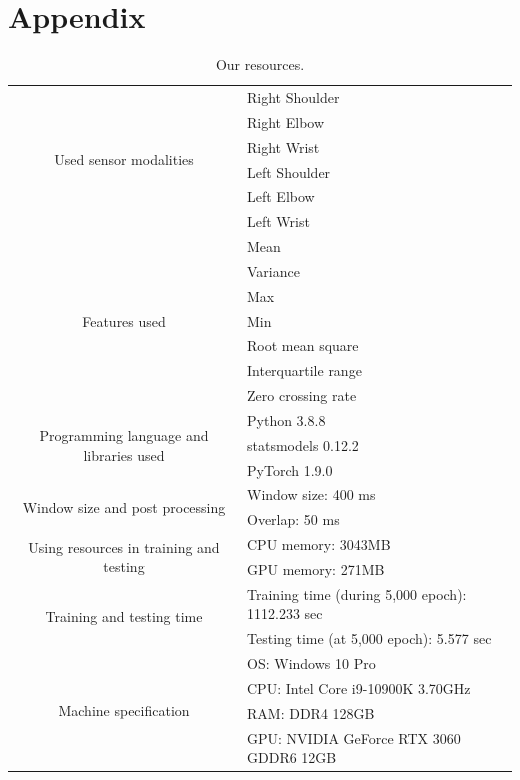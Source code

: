 \documentclass[graybox]{svmult}
\begin{document}





\section*{Appendix}

\begin{table}[ht]
    \centering
    \caption{Our resources.}
    \begin{tabular}{c|l}\hline
    \multirow{6}{*}{Used sensor modalities} & Right Shoulder \\
    & Right Elbow \\
    & Right Wrist \\
    & Left Shoulder \\
    & Left Elbow \\
    & Left Wrist \\ \hline
    \multirow{7}{*}{Features used} & Mean \\
    & Variance \\
    & Max \\
    & Min \\
    & Root mean square \\
    & Interquartile range \\
    & Zero crossing rate \\ \hline
    \multirow{3}{*}{Programming language and libraries used} & Python 3.8.8 \\
    & statsmodels 0.12.2 \\
    & PyTorch 1.9.0 \\ \hline
    \multirow{2}{*}{Window size and post processing} & Window size: 400 ms \\
    & Overlap: 50 ms \\ \hline
    \multirow{2}{*}{Using resources in training and testing} & CPU memory: 3043MB \\
    & GPU memory: 271MB \\ \hline
    \multirow{2}{*}{Training and testing time} & Training time (during 5,000 epoch): 1112.233 sec \\
    & Testing time (at 5,000 epoch): 5.577 sec \\ \hline
    \multirow{4}{*}{Machine specification} & OS: Windows 10 Pro \\
    & CPU: Intel Core i9-10900K 3.70GHz \\
    & RAM: DDR4 128GB \\
    & GPU: NVIDIA GeForce RTX 3060 GDDR6 12GB \\ \hline
    \end{tabular}
\end{table}
\end{document}
